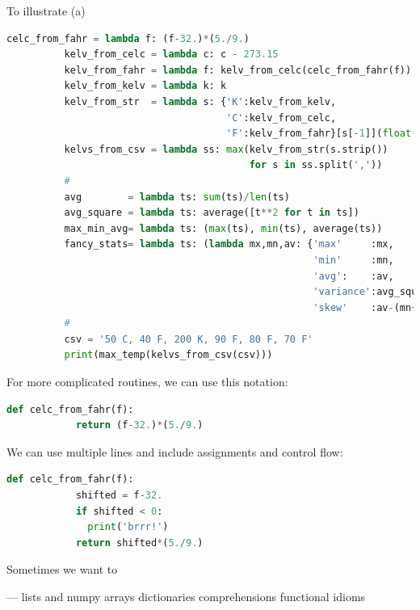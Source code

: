 \documentclass[11pt, justified]{tufte-book}
\newcommand{\attnsam}[1]{{\red \textsf{#1}}}
\newcommand{\sampassage}[1]{
   \vspace{0.1cm}
   \par\noindent{\hspace{-2cm}\normalsize \sc \gre #1} ---
}
\theoremstyle{definition}
\begin{document}
        To illustrate (a)
        \begin{lstlisting}[language=Python, basicstyle=\footnotesize\ttfamily]
          celc_from_fahr = lambda f: (f-32.)*(5./9.) 
          kelv_from_celc = lambda c: c - 273.15
          kelv_from_fahr = lambda f: kelv_from_celc(celc_from_fahr(f)) 
          kelv_from_kelv = lambda k: k
          kelv_from_str  = lambda s: {'K':kelv_from_kelv,
                                      'C':kelv_from_celc,
                                      'F':kelv_from_fahr}[s[-1]](float(s[:-1])) 
          kelvs_from_csv = lambda ss: max(kelv_from_str(s.strip())
                                          for s in ss.split(','))
          #
          avg        = lambda ts: sum(ts)/len(ts)
          avg_square = lambda ts: average([t**2 for t in ts]) 
          max_min_avg= lambda ts: (max(ts), min(ts), average(ts))
          fancy_stats= lambda ts: (lambda mx,mn,av: {'max'     :mx,
                                                     'min'     :mn,
                                                     'avg':    :av,
                                                     'variance':avg_square(ts)-av**2,
                                                     'skew'    :av-(mn+mx)/2})(max_min_avg(ts)) 
          #
          csv = '50 C, 40 F, 200 K, 90 F, 80 F, 70 F'
          print(max_temp(kelvs_from_csv(csv)))
        \end{lstlisting}

        For more complicated routines, we can use this notation:
        \begin{lstlisting}[language=Python, basicstyle=\footnotesize\ttfamily]
          def celc_from_fahr(f):
            return (f-32.)*(5./9.) 
        \end{lstlisting}
        We can use multiple lines and include assignments and control flow:
        \begin{lstlisting}[language=Python, basicstyle=\footnotesize\ttfamily]
          def celc_from_fahr(f):
            shifted = f-32.
            if shifted < 0: 
              print('brrr!')
            return shifted*(5./9.) 
        \end{lstlisting}
        
        Sometimes we want to   

      \sampassage{data in aggregate}%
        \attnsam{lists and numpy arrays} %
        \attnsam{dictionaries} %
        \attnsam{comprehensions}
        \attnsam{functional idioms}
\end{document}

